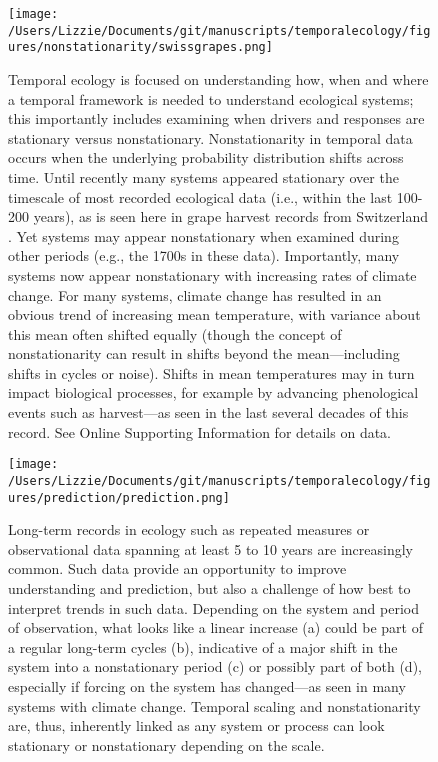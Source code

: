 \documentclass[11pt,a4paper,oneside]{article}
\begin{document}
\begin{figure}[h!]
\centering
\noindent \texttt{[image: /Users/Lizzie/Documents/git/manuscripts/temporalecology/figures/nonstationarity/swissgrapes.png]}
\caption{Temporal ecology is focused on understanding how, when and where a temporal framework is needed to understand ecological systems; this importantly includes examining when drivers and responses are stationary versus nonstationary. Nonstationarity in temporal data occurs when the underlying probability distribution shifts across time. Until recently many systems appeared stationary over the timescale of most recorded ecological data (i.e., within the last 100-200 years), as is seen here in grape harvest records from Switzerland \citep{Meier:2007zh}. Yet systems may appear nonstationary when examined during other periods (e.g., the 1700s in these data). Importantly, many systems now appear nonstationary with increasing rates of climate change. For many systems, climate change has resulted in an obvious trend of increasing mean temperature, with variance about this mean often shifted equally \citep{Huntingford2013} (though the concept of nonstationarity can result in shifts beyond the mean---including shifts in cycles or noise). Shifts in mean temperatures may in turn impact biological processes, for example by advancing phenological events such as harvest---as seen in the last several decades of this record. See Online Supporting Information for details on data.}
\end{figure}

\begin{figure}[h!]
\centering
\noindent \texttt{[image: /Users/Lizzie/Documents/git/manuscripts/temporalecology/figures/prediction/prediction.png]}
\caption{Long-term records in ecology such as repeated measures or observational data spanning at least 5 to 10 years are increasingly common. Such data provide an opportunity to improve understanding and prediction, but also a challenge of how best to interpret trends in such data. Depending on the system and period of observation, what looks like a linear increase (a) could be part of a regular long-term cycles (b), indicative of a major shift in the system into a nonstationary period (c) or possibly part of both (d), especially if forcing on the system has changed---as seen in many systems with climate change. Temporal scaling and nonstationarity are, thus, inherently linked as any system or process can look stationary or nonstationary depending on the scale.}
\end{figure}
\end{document}
